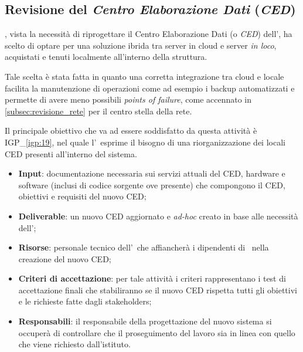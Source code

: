 	\subsection{Revisione del \textit{Centro Elaborazione Dati} (\textit{CED})}
		
		\azienda, vista la necessità di riprogettare il Centro Elaborazione Dati (o \textit{CED}) dell'\istituto, ha scelto di optare per una soluzione ibrida tra server in cloud e server \textit{in loco}, acquistati e tenuti localmente all'interno della struttura.
		
		Tale scelta è stata fatta in quanto una corretta integrazione tra cloud e locale facilita la manutenzione di operazioni come ad esempio i backup automatizzati e permette di avere meno possibili \textit{points of failure}, come accennato in \ref{subsec:revisione_rete} per il centro stella della rete.
		
		Il principale obiettivo che va ad essere soddisfatto da questa attività è {\color{pantone}IGP\_\ref{igp:19}}, nel quale l'\istituto~esprime il bisogno di una riorganizzazione dei locali CED presenti all'interno del sistema.
		
		\begin{itemize}[noitemsep]
			\renewcommand\labelitemi{--}
			\item \textbf{Input}: documentazione necessaria sui servizi attuali del CED, hardware e software (inclusi di codice sorgente ove presente) che compongono il CED, obiettivi e requisiti del nuovo CED;
			\item \textbf{Deliverable}: un nuovo CED aggiornato e \textit{ad-hoc} creato in base alle necessità dell'\istituto;
			\item \textbf{Risorse}: personale tecnico dell'\istituto~che affiancherà i dipendenti di \azienda~nella creazione del nuovo CED;
			\item \textbf{Criteri di accettazione}: per tale attività i criteri rappresentano i test di accettazione finali che stabiliranno se il nuovo CED rispetta tutti gli obiettivi e le richieste fatte dagli stakeholders;
			\item \textbf{Responsabili}: il responsabile della progettazione del nuovo sistema si occuperà di controllare che il proseguimento del lavoro sia in linea con quello che viene richiesto dall'istituto.
		\end{itemize}
		
